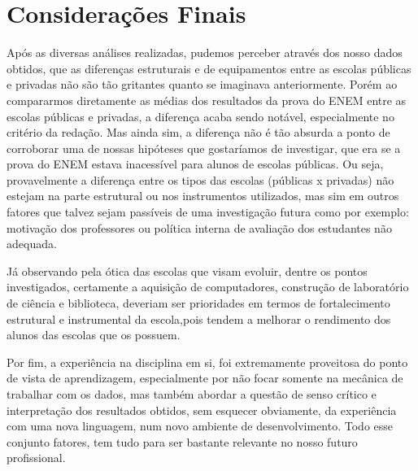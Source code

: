 \documentclass[review]{elsarticle}
\begin{document}
\section{Considerações Finais}
Após as diversas análises realizadas, pudemos perceber através dos nosso dados obtidos, que as diferenças estruturais e de equipamentos entre as escolas públicas e privadas não são tão gritantes quanto se imaginava anteriormente. Porém ao compararmos diretamente as médias dos resultados da prova do ENEM entre as escolas públicas e privadas, a diferença acaba sendo notável, especialmente no critério da redação. Mas ainda sim, a diferença não é tão absurda a ponto de corroborar uma de nossas hipóteses que gostaríamos de investigar, que era se a prova do ENEM estava inacessível para alunos de escolas públicas. Ou seja, provavelmente a diferença entre os tipos das escolas (públicas x privadas) não estejam na parte estrutural ou nos instrumentos utilizados, mas sim em outros fatores que talvez sejam passíveis de uma investigação futura como por exemplo: motivação dos professores ou política interna de avaliação dos estudantes não adequada.  

Já observando pela ótica das escolas que visam evoluir, dentre os pontos investigados, certamente a aquisição de computadores, construção de laboratório de ciência e biblioteca, deveriam ser prioridades em termos de fortalecimento estrutural e instrumental da escola,pois tendem a melhorar o rendimento dos alunos das escolas que os possuem.

Por fim, a experiência na disciplina em si, foi extremamente proveitosa do ponto de vista de aprendizagem, especialmente por não focar somente na mecânica de trabalhar com os dados, mas também abordar a questão de senso crítico e interpretação dos resultados obtidos, sem esquecer obviamente, da experiência com uma nova linguagem, num novo ambiente de desenvolvimento. Todo esse conjunto fatores, tem tudo para ser bastante relevante no nosso futuro profissional.
\end{document}
